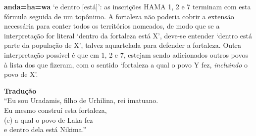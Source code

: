 \noindent\textbf{anda=ha=wa} `e dentro [está]': as inscrições HAMA 1, 2 e 7
terminam com esta fórmula seguida de um topônimo.
A fortaleza não poderia cobrir a extensão necessária para conter todos os
territórios nomeados, de modo que se a interpretação for literal `dentro da
fortaleza está X', deve-se entender `dentro está parte da população de X',
talvez aquartelada para defender a fortaleza.
Outra interpretação possível é que em 1, 2 e 7, estejam sendo adicionados outros
povos à lista dos que fizeram, com o sentido `fortaleza a qual o povo Y fez,
\emph{incluindo} o povo de X'.


\begin{flushleft}
	\noindent \textbf{Tradução}\\
	\noindent [1] ``Eu sou Uradamis, filho de Urhilina, rei imatuano.\\
	\noindent [2] Eu mesmo construí esta fortaleza,\\
	\noindent [3] (e) a qual o povo de Laka fez\\
	\noindent [4] e dentro dela está Nikima.''
\end{flushleft}

